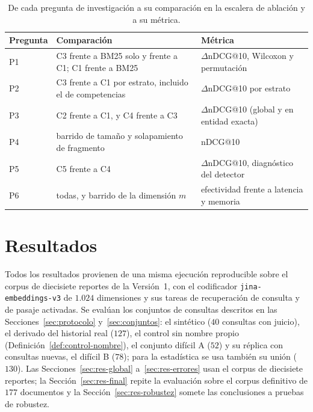 \documentclass[11pt,letterpaper]{article}
\numberwithin{equation}{section}
\begin{document}
\begin{table}[htbp]
\centering
\footnotesize
\setlength{\tabcolsep}{6pt}
\renewcommand{\arraystretch}{1.25}
\caption{De cada pregunta de investigación a su comparación en la escalera de ablación y a su métrica.}
\label{tab:preguntas}
\begin{tabularx}{\textwidth}{@{}l Y Y@{}}
\toprule
\textbf{Pregunta} & \textbf{Comparación} & \textbf{Métrica} \\
\midrule
P1 & C3 frente a BM25 solo y frente a C1; C1 frente a BM25 & $\Delta$nDCG@10, Wilcoxon y permutación \\
P2 & C3 frente a C1 por estrato, incluido el de competencias & $\Delta$nDCG@10 por estrato \\
P3 & C2 frente a C1, y C4 frente a C3 & $\Delta$nDCG@10 (global y en entidad exacta) \\
P4 & barrido de tamaño y solapamiento de fragmento & nDCG@10 \\
P5 & C5 frente a C4 & $\Delta$nDCG@10, diagnóstico del detector \\
P6 & todas, y barrido de la dimensión $m$ & efectividad frente a latencia y memoria \\
\bottomrule
\end{tabularx}
\end{table}

\section{Resultados}
\label{sec:resultados}
Todos los resultados provienen de una misma ejecución reproducible sobre el corpus de diecisiete reportes de la Versión~1, con el codificador \texttt{jina-embeddings-v3} de $1.024$ dimensiones y sus tareas de recuperación de consulta y de pasaje activadas. Se evalúan los conjuntos de consultas descritos en las Secciones~\ref{sec:protocolo} y~\ref{sec:conjuntos}: el sintético ($40$ consultas con juicio), el derivado del historial real ($127$), el control sin nombre propio (Definición~\ref{def:control-nombre}), el conjunto difícil A ($52$) y su réplica con consultas nuevas, el difícil B ($78$); para la estadística se usa también su unión ($130$). Las Secciones~\ref{sec:res-global} a~\ref{sec:res-errores} usan el corpus de diecisiete reportes; la Sección~\ref{sec:res-final} repite la evaluación sobre el corpus definitivo de $177$ documentos y la Sección~\ref{sec:res-robustez} somete las conclusiones a pruebas de robustez.
\end{document}
